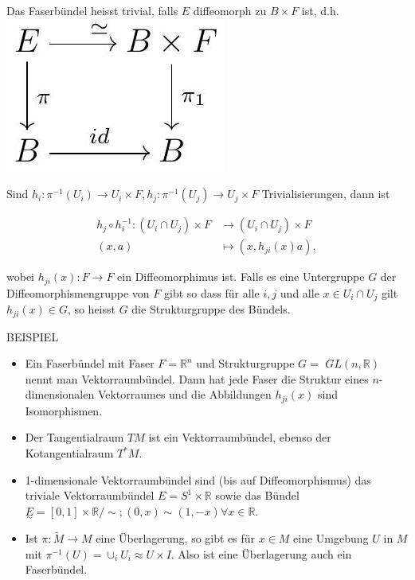 \documentclass[10pt, letterpaper]{article}
\begin{document}
Das Faserbündel heisst trivial, falls $E$ diffeomorph zu $B \times F$ ist, d.h.\\
\includegraphics[max width=\textwidth, center]{2025_05_20_3825c151ba0898b77b6eg-068}

Sind $h_{i}: \pi^{-1}\left(U_{i}\right) \rightarrow U_{i} \times F, h_{j}: \pi^{-1}\left(U_{j}\right) \rightarrow U_{j} \times F$ Trivialisierungen, dann ist

$$
\begin{aligned}
h_{j} \circ h_{i}^{-1}:\left(U_{i} \cap U_{j}\right) \times F & \rightarrow\left(U_{i} \cap U_{j}\right) \times F \\
(x, a) & \mapsto\left(x, h_{j i}(x) a\right),
\end{aligned}
$$

wobei $h_{j i}(x): F \rightarrow F$ ein Diffeomorphimus ist. Falls es eine Untergruppe $G$ der Diffeomorphismengruppe von $F$ gibt so dass für alle $i, j$ und alle $x \in U_{i} \cap U_{j}$ gilt $h_{j i}(x) \in G$, so heisst $G$ die Strukturgruppe des Bündels.

BEISPIEL

\begin{itemize}
  \item Ein Faserbündel mit Faser $F=\mathbb{R}^{n}$ und Strukturgruppe $G=$ $G L(n, \mathbb{R})$ nennt man Vektorraumbündel. Dann hat jede Faser die Struktur eines $n$-dimensionalen Vektorraumes und die Abbildungen $h_{j i}(x)$ sind Isomorphismen.
  \item Der Tangentialraum $T M$ ist ein Vektorraumbündel, ebenso der Kotangentialraum $T^{*} M$.
  \item 1-dimensionale Vektorraumbündel sind (bis auf Diffeomorphismus) das triviale Vektorraumbündel $E=S^{1} \times \mathbb{R}$ sowie das Bündel $\underset{\sim}{E}=[0,1] \times \mathbb{R} / \sim ;(0, x) \sim(1,-x) \forall x \in \mathbb{R}$.
  \item Ist $\pi: \tilde{M} \rightarrow M$ eine Überlagerung, so gibt es für $x \in M$ eine Umgebung $U$ in $M$ mit $\pi^{-1}(U)=\cup_{i} U_{i} \approx U \times I$. Also ist eine Überlagerung auch ein Faserbündel.
\end{itemize}
\end{document}
